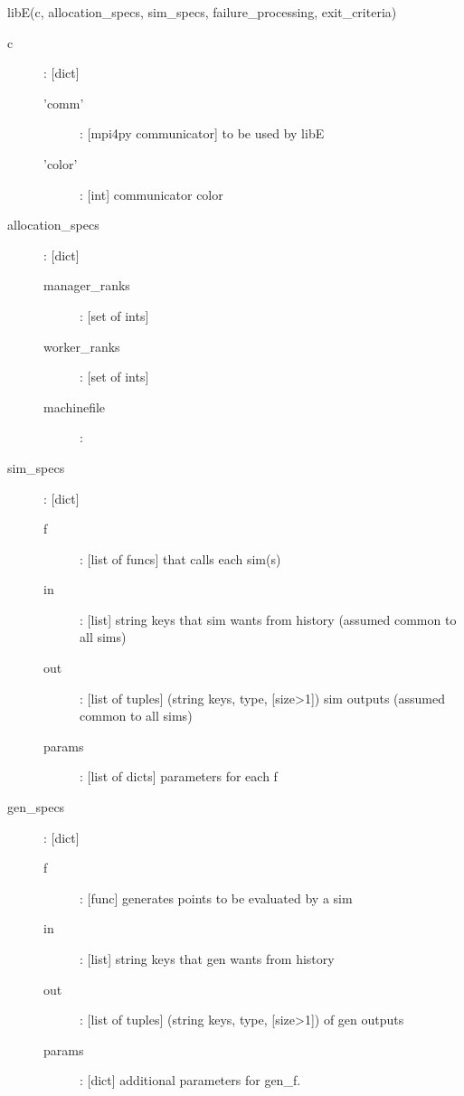 \documentclass{article}
\newenvironment{allintypewriter}{\ttfamily}{\par}
\begin{document}
\begin{allintypewriter}
  libE(c, allocation\_specs, sim\_specs, failure\_processing, exit\_criteria)\\

  \begin{description}
    \item[c]: [dict] 
      \begin{description}
        \item['comm']: [mpi4py communicator] to be used by libE
        \item['color']: [int] communicator color
      \end{description}

    \item[allocation\_specs]: [dict]
      \begin{description}
        \item[manager\_ranks]: [set of ints] 
        \item[worker\_ranks]: [set of ints]
        \item[machinefile]:
      \end{description}

    \item[sim\_specs]: [dict] 
      \begin{description}
        \item[f]: [list of funcs] that calls each sim(s)
        \item[in]: [list] string keys that sim wants from history (assumed common to all sims)
        \item[out]: [list of tuples] (string keys, type, [size>1]) sim outputs (assumed common to all sims)
        \item[params]: [list of dicts] parameters for each f
      \end{description}

    \item[gen\_specs]: [dict] 
      \begin{description}
        \item[f]: [func] generates points to be evaluated by a sim
        \item[in]: [list] string keys that gen wants from history
        \item[out]: [list of tuples] (string keys, type, [size>1]) of gen outputs
        \item[params]: [dict] additional parameters for gen\_f. 
      \end{description}


\end{description}
\end{allintypewriter}
\end{document}

